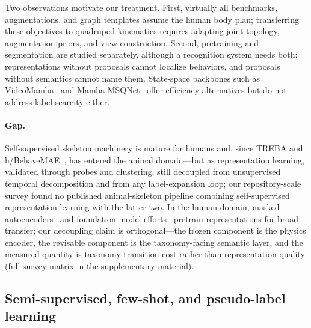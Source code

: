 Two observations motivate our treatment. First, virtually all benchmarks, augmentations, and graph templates assume the human body plan; transferring these objectives to quadruped kinematics requires adapting joint topology, augmentation priors, and view construction. Second, pretraining and segmentation are studied separately, although a recognition system needs both: representations without proposals cannot localize behaviors, and proposals without semantics cannot name them. State-space backbones such as VideoMamba~\citep{videomamba2024} and Mamba-MSQNet~\citep{fazzari2024mambamsqnet} offer efficiency alternatives but do not address label scarcity either.

\paragraph{Gap.}
Self-supervised skeleton machinery is mature for humans and, since TREBA and h/BehaveMAE~\citep{sun2021treba,stoffl2024behavemae}, has entered the animal domain---but as representation learning, validated through probes and clustering, still decoupled from unsupervised temporal decomposition and from any label-expansion loop; our repository-scale survey found no published animal-skeleton pipeline combining self-supervised representation learning with the latter two. In the human domain, masked autoencoders~\citep{skeletonmae2022} and foundation-model efforts~\citep{skeletonfm2025} pretrain representations for broad transfer; our decoupling claim is orthogonal---the frozen component is the physics encoder, the revisable component is the taxonomy-facing semantic layer, and the measured quantity is taxonomy-transition cost rather than representation quality (full survey matrix in the supplementary material).

\subsection{Semi-supervised, few-shot, and pseudo-label learning}\label{ssec:rw-semi}

